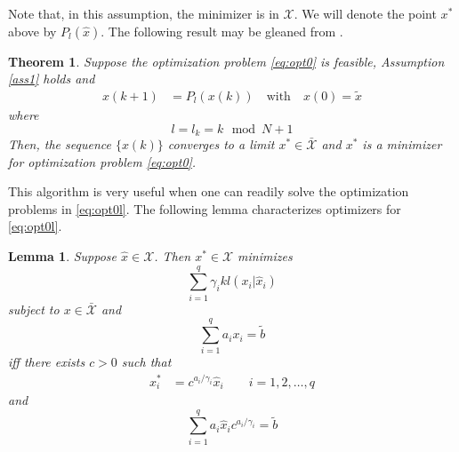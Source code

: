 \documentclass[twocolumn]{article}
\newtheorem{lemma}{Lemma}
\newtheorem{theorem}{Theorem}
\begin{document}
Note that, in this assumption,  the minimizer is in  \mbox{$\mathcal{X}$}.
We will denote the point $x^*$ above by 
$
P_l(\hat{x})
$.
The  following result may be gleaned from  \cite{Bregman1967}.


\begin{theorem}
\label{th:Bregman}
Suppose the optimization problem \eqref{eq:opt0} is feasible,  Assumption \ref{ass1} holds and
\begin{align}
x(k+1) &= P_{l}(x(k))		\quad \text{with} \quad x(0)=\tilde{x}
\end{align}
where 
\begin{equation*}
l= l_k= k\, \bmod N +1
\end{equation*}
Then, the sequence $\{x(k)\}$ converges to a limit $x^* \in \bar{\mathcal X}$ and  $x^*$
is a minimizer for  optimization problem \eqref{eq:opt0}.
\end{theorem}

This algorithm is very useful when one can readily solve the optimization problems in \eqref{eq:opt0l}.
The following lemma characterizes optimizers for \eqref{eq:opt0l}.


\begin{lemma}
\label{lem:lembasic}
Suppose $\hat{x} \in \mathcal{X}$.
Then
$
x^*  \in \mathcal{X}
$
minimizes
\begin{equation}
\label{eq:gencost}
 \sum_{i =1}^q  \gamma_ikl(x_i | \hat{x}_i) 
 \end{equation}
 subject to $x\in \bar{\mathcal X}$ and
\begin{equation}
\label{eq:linconstraint}
\sum_{i=1}^q a_ix_i = \tilde{b}
 \end{equation}
iff there exists $c>0$ such that
\begin{equation}
\label{eq:lem3result}
\begin{aligned}
x^*_i &= c^{a_i/\gamma_i}  \hat{x}_i 
\qquad i=1,2,\dots, q
\end{aligned}
\end{equation}
and
\begin{equation}
\label{eq:c1i0}
 {\sum_{i=1}^q a_{i}\hat{x}_ic^{a_i/\gamma_i}} = \tilde{b}
\end{equation}
\end{lemma}
\end{document}
